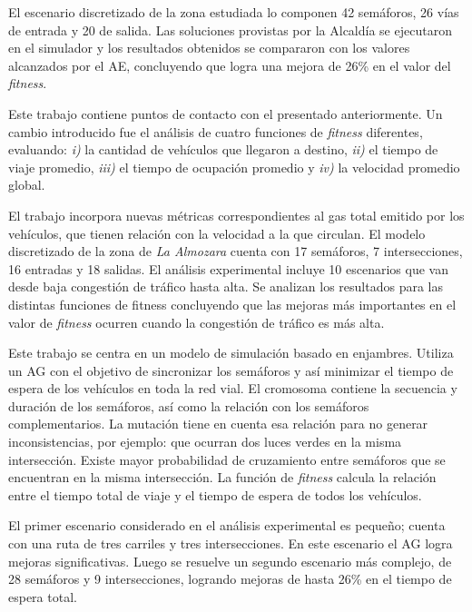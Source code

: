 \begin{itemize}
\begin{item}
El escenario discretizado de la zona estudiada lo componen 42 semáforos, 26 vías de entrada y 20 de salida. Las soluciones provistas por la Alcaldía se ejecutaron en el simulador y los resultados obtenidos se compararon con los valores alcanzados por el AE, concluyendo que logra una mejora de 26\% en el valor del \emph{fitness}.

\end{item}

\begin{item}

Este trabajo contiene puntos de contacto con el presentado anteriormente. Un cambio introducido fue el análisis de cuatro funciones de \emph{fitness} diferentes, evaluando: \textit{i)} la cantidad de vehículos que llegaron a destino, \textit{ii)} el tiempo de viaje promedio, \textit{iii)} el tiempo de ocupación promedio y \textit{iv)} la velocidad promedio global. 

El trabajo incorpora nuevas métricas correspondientes al gas total emitido por los vehículos, que tienen relación con la velocidad a la que circulan. El modelo discretizado de la zona de \emph{La Almozara} cuenta con 17 semáforos, 7 intersecciones, 16 entradas y 18 salidas. El análisis experimental incluye 10 escenarios que van desde baja congestión de tráfico hasta alta. Se analizan los resultados para las distintas funciones de fitness concluyendo que las mejoras más importantes en el valor de \emph{fitness} ocurren cuando la congestión de tráfico es más alta.

\end{item}


\begin{item}

Este trabajo se centra en un modelo de simulación basado en enjambres. Utiliza un AG con el objetivo de sincronizar los semáforos y así minimizar el tiempo de espera de los vehículos en toda la red vial. El cromosoma contiene la secuencia y duración de los semáforos, así como la relación con los semáforos complementarios. La mutación tiene en cuenta esa relación para no generar inconsistencias, por ejemplo: que ocurran dos luces verdes en la misma intersección. Existe mayor probabilidad de cruzamiento entre semáforos que se encuentran en la misma intersección. La función de \emph{fitness} calcula la relación entre el tiempo total de viaje y el tiempo de espera de todos los vehículos. 

El primer escenario considerado en el análisis experimental es pequeño; cuenta con una ruta de tres carriles y tres intersecciones. En este escenario el AG logra mejoras significativas. Luego se resuelve un segundo escenario más complejo, de 28 semáforos y 9 intersecciones, logrando mejoras de hasta 26\% en el tiempo de espera total.
\end{item}	



\end{itemize}
